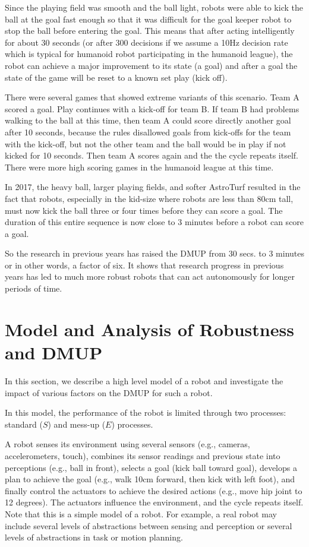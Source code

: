 \documentclass[runningheads]{llncs}
\begin{document}
Since the playing field was smooth and the ball light, robots were able to kick the ball at the goal fast enough so that it was difficult for the goal keeper robot to stop the ball before entering the goal.
This means that after acting intelligently for about 30 seconds (or after 300 decisions if we assume a 10Hz decision rate which is typical for humanoid robot participating in the humanoid league), the robot can achieve a major improvement to its state (a goal) and after a goal the state of the game will be reset to a known set play (kick off).

There were several games that showed extreme variants of this scenario. Team A scored a goal. Play continues with a kick-off for team B. 
If team B had problems walking to the ball at this time, then team A could score directly another goal after 10 seconds, because the rules disallowed goals from kick-offs for the team with the kick-off, but not the other team and the ball would be in play if not kicked for 10 seconds. 
Then team A scores again and the the cycle repeats itself.  
There were more high scoring games in the humanoid league at this time.

In 2017, the heavy ball, larger playing fields, and softer AstroTurf resulted in the fact that robots, especially in the kid-size where robots are less than 80cm tall, must now kick the ball three or four times before they can score a goal. The duration of this entire sequence is now close to 3 minutes before a robot can score a goal.

So the research in previous years has raised the DMUP from 30 secs. to 3 minutes or in other words, a factor of six. 
It shows that research progress in previous years has led to much more robust robots that can act autonomously for longer periods of time.

\section{Model and Analysis of Robustness and DMUP}
\label{sec:analysis}

In this section, we describe a high level model of a robot and investigate the impact of various factors on the DMUP for such a robot.

In this model, the performance of the robot is limited through two processes: standard ($S$) and mess-up ($E$) processes.

A robot senses its environment using several sensors (e.g., cameras, accelerometers, touch), combines its sensor readings and previous state into perceptions (e.g., ball in front), selects a goal (kick ball toward goal), develops a plan to achieve the goal (e.g., walk 10cm forward, then kick with left foot), and finally control the actuators to achieve the desired actions (e.g., move hip joint to 12 degrees). The actuators influence the environment, and the cycle repeats itself.
Note that this is a simple model of a robot. For example, a real robot may include several levels of abstractions between sensing and perception or several levels of abstractions in task or motion planning.
\end{document}
